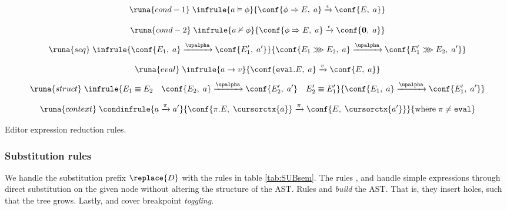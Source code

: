 \begin{table}[H]
    \centering
    \begin{multicols}{2}
      \begin{equation*}
        \runa{cond-1}\; \infrule{a \vDash \phi}{\conf{\phi \Rightarrow E,\; a} \xrightarrow{\epsilon} \conf{E,\; a}}      
      \end{equation*}
    \end{multicols}
    \vspace*{-1.5cm}
    \begin{multicols}{2}
      \begin{equation*}
        \runa{cond-2}\; \infrule{a \nvDash \phi}{\conf{\phi \Rightarrow E,\; a} \xrightarrow{\epsilon} \conf{\mathbf{0},\; a}}
      \end{equation*}\break
      \begin{equation*}
          \runa{seq}\; \infrule{\conf{E_1,\; a} \xrightarrow{\upalpha} \conf{E_1',\; a'}}{\conf{E_1 \ggg E_2,\; a} \xrightarrow{\upalpha} \conf{E'_1 \ggg E_2,\; a'}}
      \end{equation*}
    \end{multicols}
    \vspace*{-1.5cm}
    \begin{multicols}{2}
      \begin{equation*}
        \runa{eval}\; \infrule{a \rightarrow v}{\conf{\texttt{eval}.E,\; a} \xrightarrow{v} \conf{E,\; a}}
    \end{equation*}\break
    \begin{equation*}
          \runa{struct}\; \infrule{E_1 \equiv E_2 \quad \conf{E_2,\; a} \xrightarrow{\upalpha} \conf{E_2',\; a'} \quad E_2' \equiv E_1'}{\conf{E_1,\; a} \xrightarrow{\upalpha} \conf{E_1',\; a'}}
      \end{equation*}
    \end{multicols}
    \vspace{-1cm}
    \begin{equation*}
        \runa{context}\; \condinfrule{a \xrightarrow{\pi} a'}{\conf{\pi.E,\; \cursorctx{a}} \xrightarrow{\pi} \conf{E,\; \cursorctx{a'}}}{\text{where}\; \pi \neq \texttt{eval}}
    \end{equation*}
    \caption{Editor expression reduction rules.}
    \label{tab:EEsem}
\end{table}

\subsubsection*{Substitution rules}
We handle the substitution prefix $\replace{D}$ with the rules in table \ref{tab:SUBsem}. The rules ,  and  handle simple expressions through direct substitution on the given node without altering the structure of the AST. Rules  and  \textit{build} the AST. That is, they insert holes, such that the tree grows. Lastly,  and  cover breakpoint \textit{toggling}.
\vspace*{-0.8cm}

